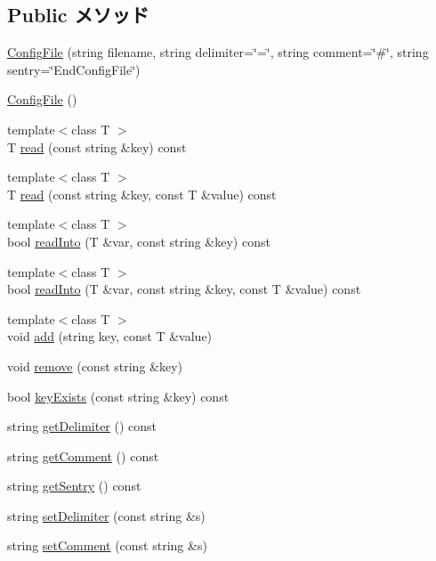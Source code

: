 \subsection*{Public メソッド}
\begin{DoxyCompactItemize}
\item 
\hyperlink{classConfigFile_a161016a864f1f19d99b839dddf863c3f}{ConfigFile} (string filename, string delimiter=\char`\"{}=\char`\"{}, string comment=\char`\"{}\#\char`\"{}, string sentry=\char`\"{}EndConfigFile\char`\"{})
\item 
\hyperlink{classConfigFile_ad4ed3e0910ee375843bd52dea576f857}{ConfigFile} ()
\item 
{\footnotesize template$<$class T $>$ }\\T \hyperlink{classConfigFile_a86e0a00c9c37c874780c96de72b10dbe}{read} (const string \&key) const 
\item 
{\footnotesize template$<$class T $>$ }\\T \hyperlink{classConfigFile_a1cb8eb61d921281aec93e521322ccb21}{read} (const string \&key, const T \&value) const 
\item 
{\footnotesize template$<$class T $>$ }\\bool \hyperlink{classConfigFile_ab78f330f4639ddc70bfcff5f84e24dbd}{readInto} (T \&var, const string \&key) const 
\item 
{\footnotesize template$<$class T $>$ }\\bool \hyperlink{classConfigFile_a327741b7d63a05fb0d72b7a1b327f1a7}{readInto} (T \&var, const string \&key, const T \&value) const 
\item 
{\footnotesize template$<$class T $>$ }\\void \hyperlink{classConfigFile_ae5572f6ea39c55a1dd89ce5d010171b3}{add} (string key, const T \&value)
\item 
void \hyperlink{classConfigFile_ab700f16011dd07b6f97e8742209a177d}{remove} (const string \&key)
\item 
bool \hyperlink{classConfigFile_a375a61510313ca09287a55d05e1db4a9}{keyExists} (const string \&key) const 
\item 
string \hyperlink{classConfigFile_a444984d73515fa482ed20213fd9e650e}{getDelimiter} () const 
\item 
string \hyperlink{classConfigFile_a38c1221545e57988ae11c60f695eff07}{getComment} () const 
\item 
string \hyperlink{classConfigFile_ab17a5e6d4c88fa106b1710af1cd3a2c2}{getSentry} () const 
\item 
string \hyperlink{classConfigFile_a3b1fedd0dc8fe87a03fb4f09ad6c93ae}{setDelimiter} (const string \&s)
\item 
string \hyperlink{classConfigFile_acd6365b5496ff99970ccde0c800202ef}{setComment} (const string \&s)
\end{DoxyCompactItemize}
